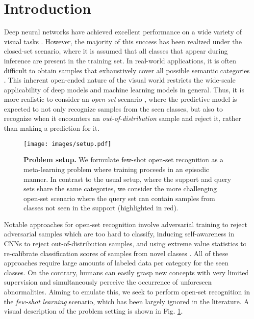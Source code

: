 \section{Introduction}
Deep neural networks have achieved excellent performance on a wide variety of visual tasks \cite{he2016deep,lin2017feature,long2015fully}. However, the majority of this success has been realized under the closed-set scenario, where it is assumed that all classes that appear during inference are present in the training set. In real-world applications, it is often difficult to obtain samples that exhaustively cover all possible semantic categories \cite{openlongtailrecognition}. This inherent open-ended nature of the visual world restricts the wide-scale applicability of deep models and machine learning models in general. Thus, it is more realistic to consider an \textit{open-set} scenario \cite{geng2020recent}, where the predictive model is expected to not only recognize samples from the seen classes, but also to recognize when it encounters an \textit{out-of-distribution} sample and reject it, rather than making a prediction for it.

\begin{figure}
    \centering
    \texttt{[image: images/setup.pdf]}
    \caption{\textbf{Problem setup.} We formulate few-shot open-set recognition as a meta-learning problem where training proceeds in an episodic manner. In contrast to the usual setup, where the support and query sets share the same categories, we consider the more challenging open-set scenario where the query set can contain samples from classes not seen in the support (highlighted in red).}
    \label{fig:prob_setup}
\end{figure}

Notable approaches for open-set recognition involve adversarial training \cite{Lu_2017_ICCV} to reject adversarial samples which are too hard to classify, inducing self-awareness in CNNs \cite{hendrycks17baseline} to reject out-of-distribution samples, and using extreme value statistics to re-calibrate classification scores of samples from novel classes \cite{open_max}. All of these approaches require large amounts of labeled data per category for the seen classes. On the contrary, humans can easily grasp new concepts with very limited supervision and simultaneously perceive the occurrence of unforeseen abnormalities. Aiming to emulate this, we seek to perform open-set recognition in the \textit{few-shot learning} scenario, which has been largely ignored in the literature. A visual description of the problem setting is shown in Fig. \ref{fig:prob_setup}. 

